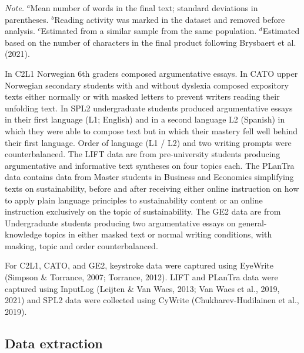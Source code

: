 \documentclass[
  man,floatsintext]{apa7}
\begin{document}
\begin{landscape}
\begin{table}[tbp]
\begin{center}
\begin{threeparttable}
{}

\begin{tablenotes}[para]
\normalsize{\textit{Note.} $^a$Mean number of words in the final text; standard deviations in parentheses. $^b$Reading activity was marked in the dataset and removed before analysis. $^c$Estimated from a similar sample from the same population. $^d$Estimated based on the number of characters in the final product following Brysbaert et al. (2021).}
\end{tablenotes}

\end{threeparttable}
\end{center}

\end{table}

\end{landscape}

In C2L1 Norwegian 6th graders composed argumentative essays. In CATO upper Norwegian secondary students with and without dyslexia composed expository texts either normally or with masked letters to prevent writers reading their unfolding text. In SPL2 undergraduate students produced argumentative essays in their first language (L1; English) and in a second language L2 (Spanish) in which they were able to compose text but in which their mastery fell well behind their first language. Order of language (L1 / L2) and two writing prompts were counterbalanced. The LIFT data are from pre-university students producing argumentative and informative text syntheses on four topics each. The PLanTra data contains data from Master students in Business and Economics simplifying texts on sustainability, before and after receiving either online instruction on how to apply plain language principles to sustainability content or an online instruction exclusively on the topic of sustainability. The GE2 data are from Undergraduate students producing two argumentative essays on general-knowledge topics in either masked text or normal writing conditions, with masking, topic and order counterbalanced.

For C2L1, CATO, and GE2, keystroke data were captured using EyeWrite (Simpson \& Torrance, 2007; Torrance, 2012). LIFT and PLanTra data were captured using InputLog (Leijten \& Van Waes, 2013; Van Waes et al., 2019, 2021) and SPL2 data were collected using CyWrite (Chukharev-Hudilainen et al., 2019).

\hypertarget{data-extraction}{%
\subsection{Data extraction}\label{data-extraction}}
\end{document}
